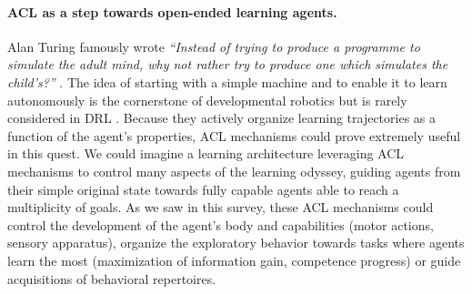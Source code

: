 \documentclass{article}
\newcommand{\todo}[1]{}
\renewcommand{\todo}[1]{{\color{myred} Todo: {#1}}}
\begin{document}
\paragraph{ACL as a step towards open-ended learning agents.}\hspace{-0.2cm}Alan Turing famously wrote \textit{``Instead of trying to produce a programme to simulate the adult mind, why not rather try to produce one which simulates the child's?''} \cite{turing1950computing}. The idea of starting with a simple machine and to enable it to learn autonomously is the cornerstone of developmental robotics but is rarely considered in DRL \cite{imagine,diayn,metarl-carml}. Because they actively organize learning trajectories as a function of the agent's properties, ACL mechanisms could prove extremely useful in this quest. We could imagine a learning architecture leveraging ACL mechanisms to control many aspects of the learning odyssey, guiding agents from their simple original state towards fully capable agents able to reach a multiplicity of goals. As we saw in this survey, these ACL mechanisms could control the development of the agent's body and capabilities (motor actions, sensory apparatus), organize the exploratory behavior towards tasks where agents learn the most (maximization of information gain, competence progress) or guide acquisitions of behavioral repertoires.
 
 
 
 
 









 
\end{document}
